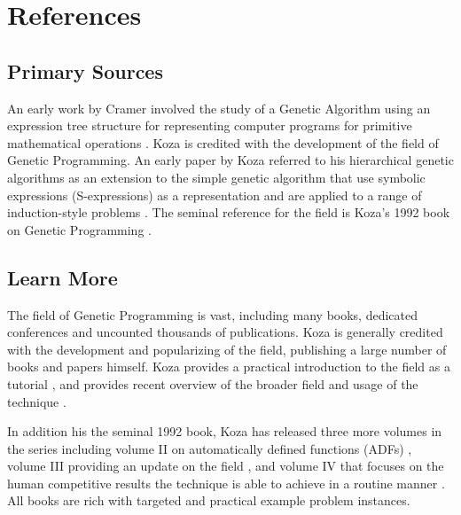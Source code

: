 \documentclass[a4paper, 11pt]{article}
\begin{document}
\section{References}
\label{sec:references}

% 
% 
\subsection{Primary Sources}
An early work by Cramer involved the study of a Genetic Algorithm using an expression tree structure for representing computer programs for primitive mathematical operations \cite{Cramer1985}.
Koza is credited with the development of the field of Genetic Programming.
An early paper by Koza referred to his hierarchical genetic algorithms as an extension to the simple genetic algorithm that use symbolic expressions (S-expressions) as a representation and are applied to a range of induction-style problems \cite{Koza1989}.
The seminal reference for the field is Koza's 1992 book on Genetic Programming \cite{Koza1992}.


% 
% 
\subsection{Learn More}
The field of Genetic Programming is vast, including many books, dedicated conferences and uncounted thousands of publications.
Koza is generally credited with the development and popularizing of the field, publishing a large number of books and papers himself. 
Koza provides a practical introduction to the field as a tutorial \cite{Koza2003a}, and provides recent overview of the broader field and usage of the technique \cite{Koza2005}.

In addition his the seminal 1992 book, Koza has released three more volumes in the series including volume II on automatically defined functions (ADFs) \cite{Koza1994}, volume III providing an update on the field \cite{Koza1999}, and volume IV that focuses on the human competitive results the technique is able to achieve in a routine manner \cite{Koza2003}. All books are rich with targeted and practical example problem instances.
\end{document}

